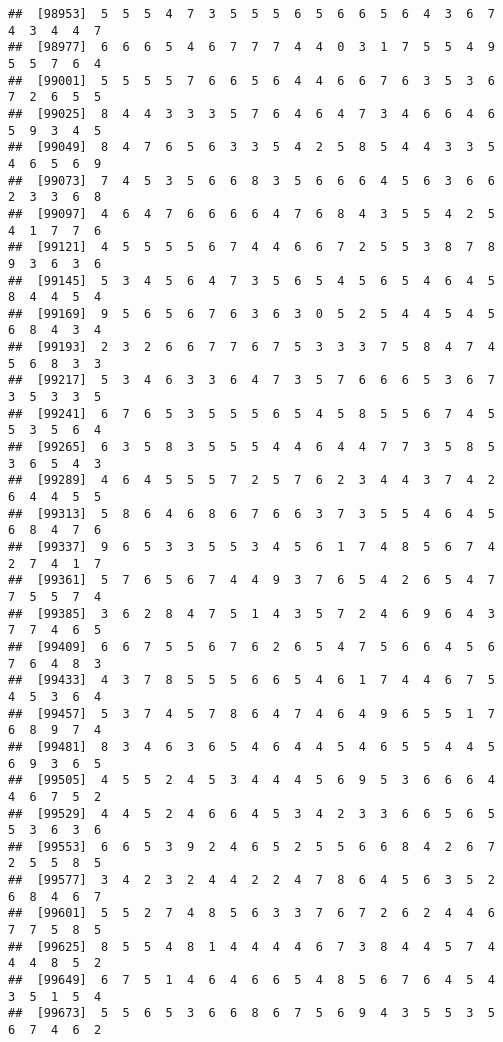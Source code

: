 \documentclass[
]{book}
\begin{document}
\begin{verbatim}
##  [98953]  5  5  5  4  7  3  5  5  5  6  5  6  6  5  6  4  3  6  7  4  3  4  4  7
##  [98977]  6  6  6  5  4  6  7  7  7  4  4  0  3  1  7  5  5  4  9  5  5  7  6  4
##  [99001]  5  5  5  5  7  6  6  5  6  4  4  6  6  7  6  3  5  3  6  7  2  6  5  5
##  [99025]  8  4  4  3  3  3  5  7  6  4  6  4  7  3  4  6  6  4  6  5  9  3  4  5
##  [99049]  8  4  7  6  5  6  3  3  5  4  2  5  8  5  4  4  3  3  5  4  6  5  6  9
##  [99073]  7  4  5  3  5  6  6  8  3  5  6  6  6  4  5  6  3  6  6  2  3  3  6  8
##  [99097]  4  6  4  7  6  6  6  6  4  7  6  8  4  3  5  5  4  2  5  4  1  7  7  6
##  [99121]  4  5  5  5  5  6  7  4  4  6  6  7  2  5  5  3  8  7  8  9  3  6  3  6
##  [99145]  5  3  4  5  6  4  7  3  5  6  5  4  5  6  5  4  6  4  5  8  4  4  5  4
##  [99169]  9  5  6  5  6  7  6  3  6  3  0  5  2  5  4  4  5  4  5  6  8  4  3  4
##  [99193]  2  3  2  6  6  7  7  6  7  5  3  3  3  7  5  8  4  7  4  5  6  8  3  3
##  [99217]  5  3  4  6  3  3  6  4  7  3  5  7  6  6  6  5  3  6  7  3  5  3  3  5
##  [99241]  6  7  6  5  3  5  5  5  6  5  4  5  8  5  5  6  7  4  5  5  3  5  6  4
##  [99265]  6  3  5  8  3  5  5  5  4  4  6  4  4  7  7  3  5  8  5  3  6  5  4  3
##  [99289]  4  6  4  5  5  5  7  2  5  7  6  2  3  4  4  3  7  4  2  6  4  4  5  5
##  [99313]  5  8  6  4  6  8  6  7  6  6  3  7  3  5  5  4  6  4  5  6  8  4  7  6
##  [99337]  9  6  5  3  3  5  5  3  4  5  6  1  7  4  8  5  6  7  4  2  7  4  1  7
##  [99361]  5  7  6  5  6  7  4  4  9  3  7  6  5  4  2  6  5  4  7  7  5  5  7  4
##  [99385]  3  6  2  8  4  7  5  1  4  3  5  7  2  4  6  9  6  4  3  7  7  4  6  5
##  [99409]  6  6  7  5  5  6  7  6  2  6  5  4  7  5  6  6  4  5  6  7  6  4  8  3
##  [99433]  4  3  7  8  5  5  5  6  6  5  4  6  1  7  4  4  6  7  5  4  5  3  6  4
##  [99457]  5  3  7  4  5  7  8  6  4  7  4  6  4  9  6  5  5  1  7  6  8  9  7  4
##  [99481]  8  3  4  6  3  6  5  4  6  4  4  5  4  6  5  5  4  4  5  6  9  3  6  5
##  [99505]  4  5  5  2  4  5  3  4  4  4  5  6  9  5  3  6  6  6  4  4  6  7  5  2
##  [99529]  4  4  5  2  4  6  6  4  5  3  4  2  3  3  6  6  5  6  5  5  3  6  3  6
##  [99553]  6  6  5  3  9  2  4  6  5  2  5  5  6  6  8  4  2  6  7  2  5  5  8  5
##  [99577]  3  4  2  3  2  4  4  2  2  4  7  8  6  4  5  6  3  5  2  6  8  4  6  7
##  [99601]  5  5  2  7  4  8  5  6  3  3  7  6  7  2  6  2  4  4  6  7  7  5  8  5
##  [99625]  8  5  5  4  8  1  4  4  4  4  6  7  3  8  4  4  5  7  4  4  4  8  5  2
##  [99649]  6  7  5  1  4  6  4  6  6  5  4  8  5  6  7  6  4  5  4  3  5  1  5  4
##  [99673]  5  5  6  5  3  6  6  8  6  7  5  6  9  4  3  5  5  3  5  6  7  4  6  2

\end{verbatim}
\end{document}
